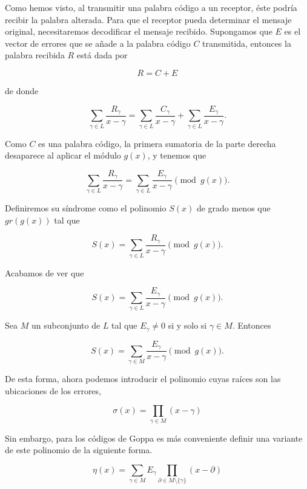 Como hemos visto, al transmitir una palabra código a un receptor, éste podría recibir la palabra alterada. Para que el receptor pueda determinar el mensaje original, necesitaremos decodificar el mensaje recibido. Supongamos que $E$ es el vector de errores que se añade a la palabra código $C$ transmitida, entonces la palabra recibida $R$ está dada por

$$R = C + E$$

de donde 

$$\sum_{\gamma \in L} \frac{R_\gamma}{x - \gamma} = \sum_{\gamma \in L} \frac{C_\gamma}{x - \gamma} + \sum_{\gamma \in L} \frac{E_\gamma}{x - \gamma}.$$

Como $C$ es una palabra código, la primera sumatoria de la parte derecha desaparece al aplicar el módulo $g(x)$, y tenemos que

$$\sum_{\gamma \in L} \frac{R_\gamma}{x - \gamma} = \sum_{\gamma \in L} \frac{E_\gamma}{x - \gamma} \pmod{g(x)}.$$

Definiremos su síndrome como el polinomio $S(x)$ de grado menos que $gr(g(x))$ tal que 

$$S(x) = \sum_{\gamma \in L} \frac{R_\gamma}{x - \gamma} \pmod{g(x)}.$$

Acabamos de ver que 

$$S(x) = \sum_{\gamma \in L} \frac{E_\gamma}{x - \gamma} \pmod{g(x)}.$$

Sea $M$ un subconjunto de $L$ tal que $E_{\gamma} \neq 0$ si y solo si $\gamma \in M$. Entonces

\begin{equation}
    \label{def:sindrome}
    S(x) = \sum_{\gamma \in M} \frac{E_\gamma}{x - \gamma} \pmod{g(x)}.
\end{equation}

De esta forma, ahora podemos introducir el polinomio cuyas raíces son las ubicaciones de los errores,

\begin{equation}
    \label{def:localizaciones}
    \sigma (x) = \prod_{\gamma \in M} (x - \gamma)
\end{equation}

Sin embargo, para los códigos de Goppa es más conveniente definir una variante de este polinomio de la siguiente forma.

\begin{equation}
    \label{def:eta}
    \eta (x) = \sum_{\gamma \in M} E_\gamma \prod_{\partial \in M \setminus \{ \gamma \} } (x - \partial)
\end{equation}

